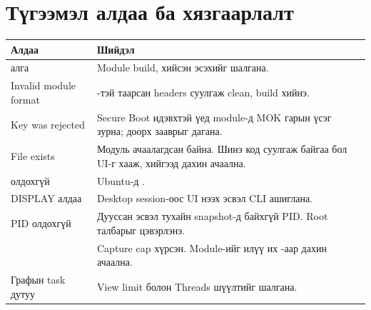 \clearpage
\section{Түгээмэл алдаа ба хязгаарлалт}
\begin{table}[H]
\centering\small
\begin{tabularx}{\textwidth}{@{}P{4cm}Y@{}}\toprule
Алдаа & Шийдэл \\\midrule
{} алга & Module build,  хийсэн эсэхийг шалгана. \\
Invalid module format & -тэй таарсан headers суулгаж clean, build хийнэ. \\
Key was rejected & Secure Boot идэвхтэй үед module-д MOK гарын үсэг зурна; доорх зааврыг дагана. \\
File exists & Модуль ачаалагдсан байна. Шинэ код суулгаж байгаа бол UI-г хааж,  хийгээд дахин ачаална. \\
 олдохгүй & Ubuntu-д . \\
DISPLAY алдаа & Desktop session-оос UI нээх эсвэл CLI ашиглана. \\
PID олдохгүй & Дууссан эсвэл тухайн snapshot-д байхгүй PID. Root талбарыг цэвэрлэнэ. \\
 & Capture cap хүрсэн. Module-ийг илүү их -аар дахин ачаална. \\
Графын task дутуу & View limit болон Threads шүүлтийг шалгана. \\\bottomrule
\end{tabularx}
\end{table}
